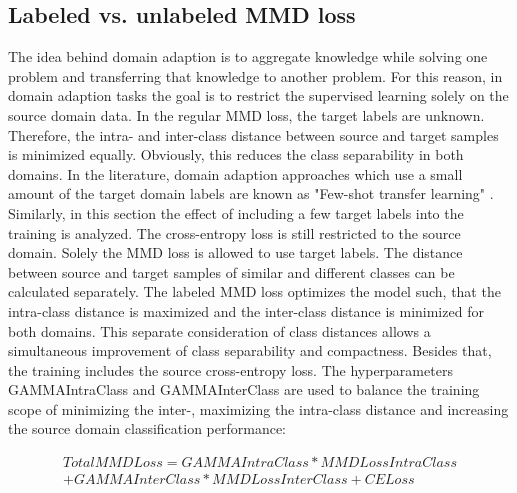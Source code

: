 \subsection{Labeled vs. unlabeled MMD loss} \label{sec:Differences of labeled and unlabeled MMD loss}

The idea behind domain adaption is to aggregate knowledge while solving one problem and transferring that knowledge to another problem. For this reason, in domain adaption tasks the goal is to restrict the supervised learning solely on the source domain data. In the regular MMD loss, the target labels are unknown. Therefore, the intra- and inter-class distance between source and target samples is minimized equally. Obviously, this reduces the class separability in both domains. In the literature, domain adaption approaches which use a small amount of the target domain labels are known as "Few-shot transfer learning" \cite{WU2020}. Similarly, in this section the effect of including a few target labels into the training is analyzed. The cross-entropy loss is still restricted to the source domain. Solely the MMD loss is allowed to use target labels. The distance between source and target samples of similar and different classes can be calculated separately. The labeled MMD loss optimizes the model such, that the intra-class distance is maximized and the inter-class distance is minimized for both domains. This separate consideration of class distances allows a simultaneous improvement of class separability and compactness. Besides that, the training includes the source cross-entropy loss. The hyperparameters GAMMAIntraClass and GAMMAInterClass are used to balance the training scope of minimizing the inter-, maximizing the intra-class distance and increasing the source domain classification performance:

\begin{equation}
\begin{split}
    TotalMMDLoss = GAMMAIntraClass * MMDLossIntraClass\\ + GAMMAInterClass * MMDLossInterClass + CELoss
\end{split}
\end{equation}

